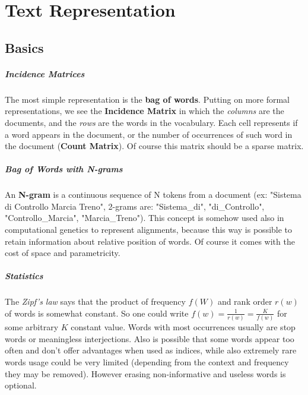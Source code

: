 \chapter{Text Representation}

\section{Basics}

\paragraph{Incidence Matrices}

The most simple representation is the \textbf{bag of words}. Putting on more formal representations, we see the \textbf{Incidence Matrix} in which the \textit{columns} are the documents, and the \textit{rows} are the words in the vocabulary. Each cell represents if a word appears in the document, or the number of occurrences of such word in the document (\textbf{Count Matrix}). Of course this matrix should be a sparse matrix.

\paragraph{Bag of Words with N-grams}

An \textbf{N-gram} is a continuous sequence of N tokens from a document (ex: "Sistema di Controllo Marcia Treno", 2-grams are: "Sistema_di", "di_Controllo", "Controllo_Marcia", "Marcia_Treno").
This concept is somehow used also in computational genetics to represent alignments, because this way is possible to retain information about relative position of words.
Of course it comes with the cost of space and parametricity.

\paragraph{Statistics}

The \textit{Zipf's law} says that the product of frequency $f(W)$ and rank order $r(w)$ of words is somewhat constant.
So one could write $f(w) = \frac 1 {r(w)} = \frac K {f(w)}$ for some arbitrary $K$ constant value.
Words with most occurrences usually are stop words or meaningless interjections.
Also is possible that some words appear too often and don't offer advantages when used as indices, while also extremely rare words usage could be very limited (depending from the context and frequency they may be removed).
However erasing non-informative and useless words is optional.

